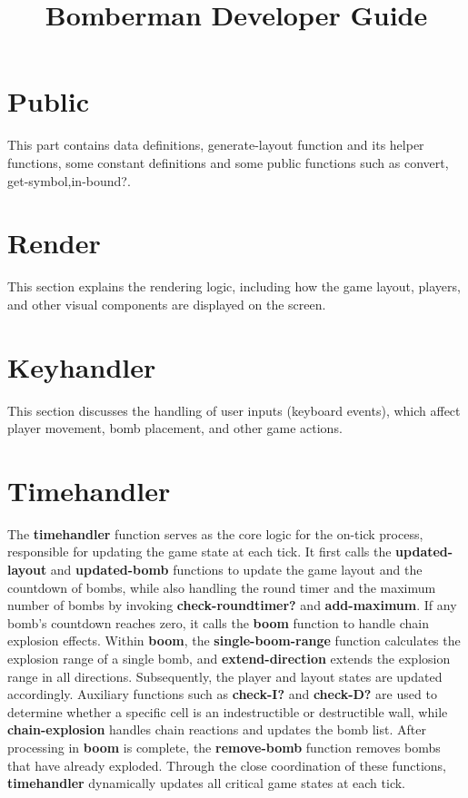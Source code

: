 \documentclass[12pt]{article}
\title{\fontsize{30}{24}\selectfont \textbf{Bomberman Developer Guide}} %
\author{}
\date{}
\begin{document}
\maketitle

\section{Public}
\hspace{1.27cm}This part contains data definitions, generate-layout function and its helper functions, some constant definitions and some public functions such as convert, get-symbol,in-bound?.
\section{Render}
\hspace{1.27cm}This section explains the rendering logic, including how the game layout, players, and other visual components are displayed on the screen.

\section{Keyhandler}
\hspace{1.27cm}This section discusses the handling of user inputs (keyboard events), which affect player movement, bomb placement, and other game actions.

\section{Timehandler}
\hspace{1.27cm}The \textbf{timehandler} function serves as the core logic for the on-tick process, responsible for updating the game state at each tick. It first calls the \textbf{updated-layout} and \textbf{updated-bomb} functions to update the game layout and the countdown of bombs, while also handling the round timer and the maximum number of bombs by invoking \textbf{check-roundtimer?} and \textbf{add-maximum}. If any bomb's countdown reaches zero, it calls the \textbf{boom} function to handle chain explosion effects. Within \textbf{boom}, the \textbf{single-boom-range} function calculates the explosion range of a single bomb, and \textbf{extend-direction} extends the explosion range in all directions. Subsequently, the player and layout states are updated accordingly. Auxiliary functions such as \textbf{check-I?} and \textbf{check-D?} are used to determine whether a specific cell is an indestructible or destructible wall, while \textbf{chain-explosion} handles chain reactions and updates the bomb list. After processing in \textbf{boom} is complete, the \textbf{remove-bomb} function removes bombs that have already exploded. Through the close coordination of these functions, \textbf{timehandler} dynamically updates all critical game states at each tick.
\end{document}
